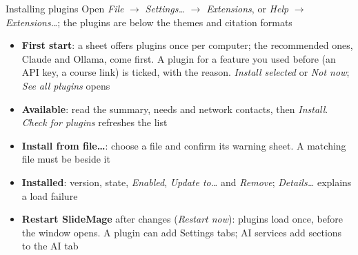 
\begin{standardframe}{Installing plugins}
	\small
	Open \emph{File} $\rightarrow$ \emph{Settings\ldots} $\rightarrow$
	\emph{Extensions}, or \emph{Help} $\rightarrow$ \emph{Extensions\ldots}; the plugins are below the themes and citation formats
	\par\medskip
	\begin{itemize}
		\item \textbf{First start}: a sheet offers plugins once per computer; the recommended ones, Claude and Ollama, come first. A plugin for a feature you used before (an API key, a course link) is ticked, with the reason. \emph{Install selected} or \emph{Not now}; \emph{See all plugins} opens 
		\item \textbf{Available}: read the summary, needs and network contacts, then \emph{Install}. \emph{Check for plugins} refreshes the list
		\item \textbf{Install from file\ldots}: choose a  file and confirm its warning sheet. A matching  file must be beside it
		\item \textbf{Installed}: version, state, \emph{Enabled}, \emph{Update to\ldots} and \emph{Remove}; \emph{Details\ldots} explains a load failure
		\item \textbf{Restart SlideMage} after changes (\emph{Restart now}): plugins load once, before the window opens. A plugin can add Settings tabs; AI services add sections to the AI tab
	\end{itemize}
\end{standardframe}
